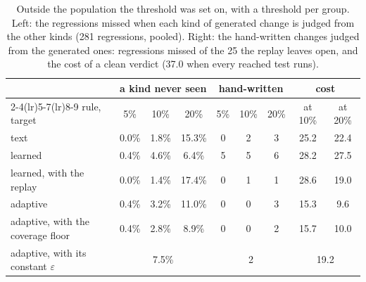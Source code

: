 \documentclass[11pt,a4paper]{article}
\begin{document}
\begin{table}[H]
\centering\small
\caption{Outside the population the threshold was set on, with a threshold per group. Left: the regressions
missed when each kind of generated change is judged from the other kinds (281 regressions, pooled). Right: the
hand-written changes judged from the generated ones: regressions missed of the 25 the replay leaves open, and the
cost of a clean verdict (37.0 when every reached test runs).}
\label{tab:shift}
\begin{tabular}{lccc ccc cc}
\toprule
 & \multicolumn{3}{c}{a kind never seen} & \multicolumn{3}{c}{hand-written} & \multicolumn{2}{c}{cost} \\
\cmidrule(lr){2-4}\cmidrule(lr){5-7}\cmidrule(lr){8-9}
rule, target & 5\% & 10\% & 20\% & 5\% & 10\% & 20\% & at 10\% & at 20\% \\
\midrule
text & 0.0\% & 1.8\% & 15.3\% & 0 & 2 & 3 & 25.2 & 22.4 \\
learned & 0.4\% & 4.6\% & 6.4\% & 5 & 5 & 6 & 28.2 & 27.5 \\
learned, with the replay & 0.0\% & 1.4\% & 17.4\% & 0 & 1 & 1 & 28.6 & 19.0 \\
adaptive & 0.4\% & 3.2\% & 11.0\% & 0 & 0 & 3 & 15.3 & 9.6 \\
adaptive, with the coverage floor & 0.4\% & 2.8\% & 8.9\% & 0 & 0 & 2 & 15.7 & 10.0 \\
\midrule
adaptive, with its constant $\varepsilon$ & \multicolumn{3}{c}{7.5\%} & \multicolumn{3}{c}{2} & \multicolumn{2}{c}{19.2} \\
\bottomrule
\end{tabular}
\end{table}
\end{document}
